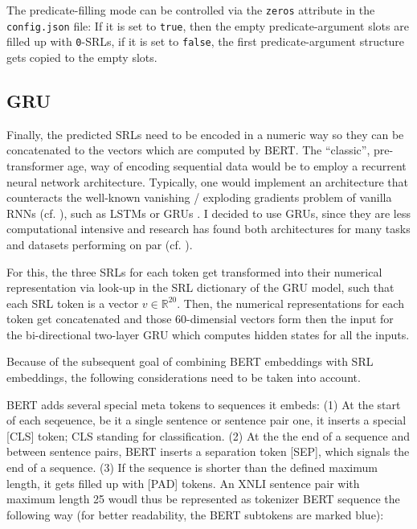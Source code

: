 \begin{tcolorbox}[
  colback=blue!5!white,
  colframe=blue!75!black,
  title={\centering Code}]

  The predicate-filling mode can be controlled via the \texttt{zeros} attribute in
  the \texttt{config.json} file: If it is set to \texttt{true}, then the empty
  predicate-argument slots are filled up with \texttt{0}-SRLs, if it is
  set to \texttt{false}, the first predicate-argument structure gets copied
  to the empty slots.

\end{tcolorbox}



\subsection{GRU}

Finally, the predicted SRLs need to be encoded in a numeric way so they can be concatenated to
the vectors which are computed by BERT. The ``classic'', pre-transformer age, way of encoding
sequential data would be to employ a recurrent neural network architecture. Typically, one would
implement an architecture that counteracts the well-known vanishing / exploding gradients problem
of vanilla RNNs (cf. \citep{bengio1994learning}), such as LSTMs \citep{hochreiter1997long} or
GRUs \citep{cho2014learning}. I decided to use GRUs, since they are less computational intensive
and research has found both architectures for many tasks and datasets performing on par (cf.
\cite{chung2014empirical}).

For this, the three SRLs for each token get transformed into their numerical representation
via look-up in the SRL dictionary of the GRU model, such that each SRL token is a vector $v \in
\mathbb{R}^{20}$. Then, the numerical representations for each token get concatenated and
those 60-dimensial vectors form then the input for the bi-directional two-layer GRU which
computes hidden states for all the inputs.

Because of the subsequent goal of combining BERT embeddings with SRL embeddings, the following
considerations need to be taken into account.


BERT adds several special meta tokens to sequences it embeds: (1) At the start of each
seqeuence, be it a single sentence or sentence pair one, it inserts a special [CLS] token; CLS
standing for classification. (2) At the the end of a sequence and between sentence pairs, BERT
inserts a separation token [SEP], which signals the end of a sequence. (3) If the sequence
is shorter than the defined maximum length, it gets filled up with [PAD] tokens. An XNLI sentence
pair with maximum length 25 woudl thus be represented as tokenizer BERT sequence the following
way (for better readability, the BERT subtokens are marked blue):

